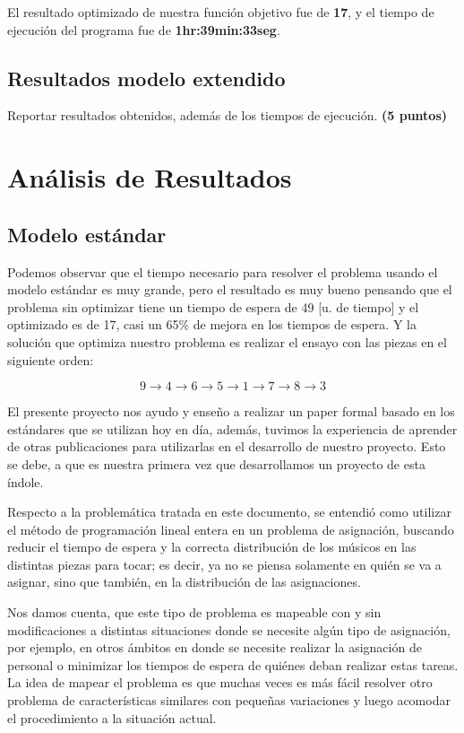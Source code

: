 \documentclass[journal, 10pt]{IEEEtran}
\begin{document}
El resultado optimizado de nuestra función objetivo fue de \textbf{17}, y el tiempo de ejecución del programa fue de \textbf{1hr:39min:33seg}.


\subsection{Resultados modelo extendido}
Reportar resultados obtenidos, además de los tiempos de ejecución. \textbf{(5 puntos)}

\section{Análisis de Resultados}
\subsection{Modelo estándar}
Podemos observar que el tiempo necesario para resolver el problema usando el modelo estándar es muy grande, pero el resultado es muy bueno pensando que el problema sin optimizar tiene un tiempo de espera de 49 [u. de tiempo] y el optimizado es de 17, casi un 65\% de mejora en los tiempos de espera. Y la solución que optimiza nuestro problema es realizar el ensayo con las piezas en el siguiente orden:

$$ 9\rightarrow4\rightarrow6\rightarrow5\rightarrow1\rightarrow7\rightarrow8\rightarrow3 $$

El presente proyecto nos ayudo y enseño a realizar un paper formal basado en los estándares que se utilizan hoy en día, además, tuvimos la experiencia de aprender de otras publicaciones para utilizarlas en el desarrollo de nuestro proyecto. Esto se debe, a que es nuestra primera vez que desarrollamos un proyecto de esta índole.

Respecto a la problemática tratada en este documento, se entendió como utilizar el método de programación lineal entera en un problema de asignación, buscando reducir el tiempo de espera y la correcta distribución de los músicos en las distintas piezas para tocar; es decir, ya no se piensa solamente en quién se va a asignar, sino que también, en la distribución de las asignaciones.

Nos damos cuenta, que este tipo de problema es mapeable con y sin modificaciones a distintas situaciones donde se necesite algún tipo de asignación, por ejemplo, en otros ámbitos en donde se necesite realizar la asignación de personal o minimizar los tiempos de espera de quiénes deban realizar estas tareas. La idea de mapear el problema es que muchas veces es más fácil resolver otro problema de características similares con pequeñas variaciones y luego acomodar el procedimiento a la situación actual.
\end{document}
